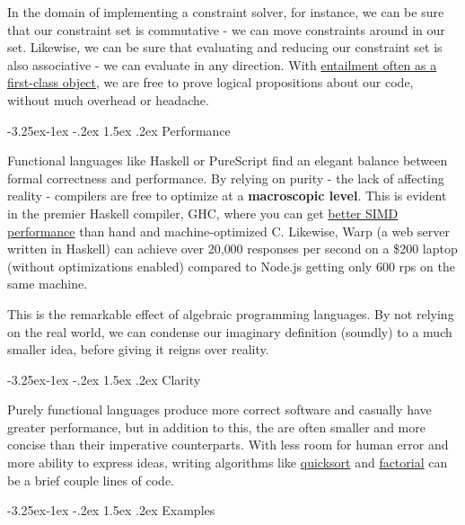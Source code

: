 \documentclass[11pt,pressrelease]{newlfm} %
\makeatletter
\newcounter{section}
\newcounter{subsection}[section]
\newcommand\subsection{\@startsection{subsection}{2}{\z@}%
                                     {-3.25ex\@plus -1ex \@minus -.2ex}%
                                     {1.5ex \@plus .2ex}%
                                     {\normalfont\large\bfseries}}
\makeatother
\begin{document}
\begin{newlfm}
\begin{singlespace}
In the domain of implementing a constraint solver, for instance, we can be sure that our constraint set
is commutative - we can move constraints around in our set. Likewise, we can be sure that evaluating
and reducing our constraint set is also associative - we can evaluate in any direction. With
\href{http://hackage.haskell.org/package/constraints-0.4.1.3/docs/Data-Constraint.html#g:3}{entailment often as a first-class object},
we are free to prove logical propositions about our code, without much overhead or headache.

\subsection{Performance}

Functional languages like Haskell or PureScript find an elegant balance between formal correctness
and performance. By relying on purity - the lack of affecting reality - compilers are free to optimize at a
\textbf{macroscopic level}. This is evident in the premier Haskell compiler, GHC,
where you can get \href{http://research.microsoft.com/en-us/um/people/simonpj/papers/ndp/haskell-beats-C.pdf}{better SIMD performance} than hand and machine-optimized C.
Likewise, Warp (a web server written in Haskell) can achieve over
20,000 responses per second on a \$200 laptop (without optimizations enabled) compared to
Node.js getting only 600 rps on the same machine.

This is the remarkable effect of algebraic programming languages. By not relying on the real world,
we can condense our imaginary definition (soundly) to a much smaller idea, before giving it reigns
over reality.

\subsection{Clarity}

Purely functional languages produce more correct software and casually have greater performance, but
in addition to this, the are often smaller and more concise than their imperative counterparts.
With less room for human error and more ability to express ideas, writing algorithms like
\href{http://c2.com/cgi/wiki?QuickSortInHaskell}{quicksort} and
\href{http://lpaste.net/133831}{factorial} can be a brief couple lines of code.

\subsection{Examples}


\end{singlespace}
\end{newlfm}
\end{document}
